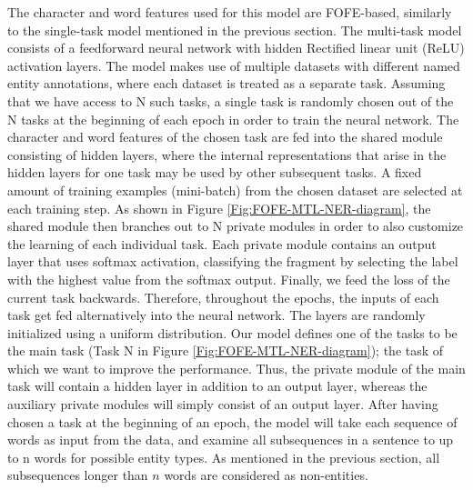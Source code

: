 \documentclass[11pt]{article}
\begin{document}
The character and word features used for this model are FOFE-based, similarly to the single-task model mentioned in the previous section. The multi-task model consists of a feedforward neural network with hidden Rectified linear unit (ReLU) \cite{Nair:2010:RLU:3104322.3104425} activation layers. The model makes use of multiple datasets with different named entity annotations, where each dataset is treated as a separate task. Assuming that we have access to N such tasks, a single task is randomly chosen out of the N tasks at the beginning of each epoch in order to train the neural network. The character and word features of the chosen task are fed into the shared module consisting of hidden layers, where the internal representations that arise in the hidden layers for one task may be used by other subsequent tasks. A fixed amount of training examples (mini-batch) from the chosen dataset are selected at each training step. As shown in Figure \ref{Fig:FOFE-MTL-NER-diagram}, the shared module then branches out to N private modules in order to also customize the learning of each individual task. Each private module contains an output layer that uses softmax activation, classifying the fragment by selecting the label with the highest value from the softmax output. Finally, we feed the loss of the current task backwards. Therefore, throughout the epochs, the inputs of each task get fed alternatively into the neural network. The layers are randomly initialized using a uniform distribution. Our model defines one of the tasks to be the main task (Task N in Figure \ref{Fig:FOFE-MTL-NER-diagram}); the task of which we want to improve the performance. Thus, the private module of the main task will contain a hidden layer in addition to an output layer, whereas the auxiliary private modules will simply consist of an output layer. After having chosen a task at the beginning of an epoch, the model will take each sequence of words as input from the data, and examine all subsequences in a sentence to up to n words for possible entity types. As mentioned in the previous section, all subsequences longer than $n$ words are considered as non-entities. 
\end{document}
